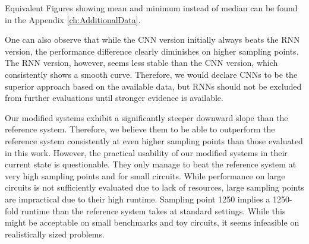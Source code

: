 Equivalent Figures showing mean and minimum instead of median can be found in the Appendix \ref{ch:AdditionalData}.

One can also observe that while the \gls{CNN} version initially always beats the \gls{RNN} version, the performance difference clearly diminishes on higher sampling points. The \gls{RNN} version, however, seems less stable than the \gls{CNN} version, which consistently shows a smooth curve. Therefore, we would declare \glspl{CNN} to be the superior approach based on the available data, but \glspl{RNN} should not be excluded from further evaluations until stronger evidence is available.

Our modified systems exhibit a significantly steeper downward slope than the reference system. Therefore, we believe them to be able to outperform the reference system consistently at even higher sampling points than those evaluated in this work. However, the practical usability of our modified systems in their current state is questionable. They only manage to beat the reference system at very high sampling points and for small circuits. While performance on large circuits is not sufficiently evaluated due to lack of resources, large sampling points are impractical due to their high runtime. Sampling point 1250 implies a 1250-fold runtime than the reference system takes at standard settings. While this might be acceptable on small benchmarks and toy circuits, it seems infeasible on realistically sized problems.

